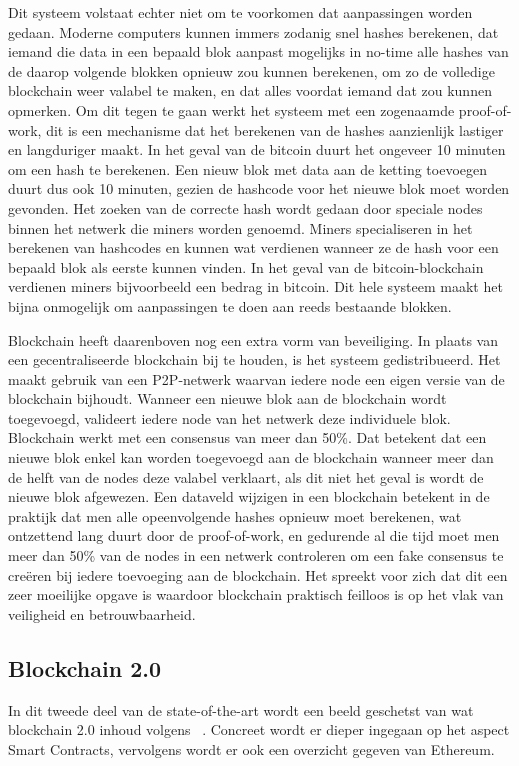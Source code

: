 Dit systeem volstaat echter niet om te voorkomen dat aanpassingen worden gedaan. Moderne computers kunnen immers zodanig snel hashes berekenen, dat iemand die data in een bepaald blok aanpast mogelijks in no-time alle hashes van de daarop volgende blokken opnieuw zou kunnen berekenen, om zo de volledige blockchain weer valabel te maken, en dat alles voordat iemand dat zou kunnen opmerken. Om dit tegen te gaan werkt het systeem met een zogenaamde proof-of-work, dit is een mechanisme dat het berekenen van de hashes aanzienlijk lastiger en  langduriger maakt. In het geval van de bitcoin duurt het ongeveer 10 minuten om een hash te berekenen. Een nieuw blok met data aan de ketting toevoegen duurt dus ook 10 minuten, gezien  de hashcode voor het  nieuwe blok moet worden gevonden. Het zoeken van de correcte hash wordt gedaan door speciale nodes binnen het netwerk die miners worden genoemd. Miners specialiseren in het berekenen van hashcodes en kunnen wat verdienen wanneer ze de hash voor een bepaald blok als eerste kunnen vinden. In het geval van de bitcoin-blockchain verdienen miners bijvoorbeeld een bedrag in bitcoin. Dit hele systeem maakt het bijna onmogelijk om aanpassingen te doen aan reeds bestaande blokken. 

Blockchain heeft daarenboven nog een extra vorm van beveiliging. In plaats van een gecentraliseerde blockchain bij te houden, is het systeem gedistribueerd. Het maakt gebruik van een P2P-netwerk waarvan iedere node een eigen versie van de blockchain bijhoudt. Wanneer een nieuwe blok aan de blockchain wordt toegevoegd, valideert iedere node van het netwerk deze individuele blok. Blockchain werkt met een consensus van meer dan 50\%. Dat betekent dat een nieuwe blok enkel kan worden toegevoegd aan de blockchain wanneer meer dan de helft van de nodes deze valabel verklaart, als dit niet het geval is wordt de nieuwe blok afgewezen. Een dataveld wijzigen in een blockchain betekent in de praktijk dat men alle opeenvolgende hashes opnieuw moet berekenen, wat ontzettend lang duurt door de proof-of-work, en  gedurende  al die tijd moet men meer dan 50\% van de nodes in een netwerk controleren om een fake consensus te creëren bij iedere toevoeging aan de blockchain. Het spreekt voor zich dat dit een zeer moeilijke opgave is waardoor blockchain praktisch feilloos is op het vlak van veiligheid en betrouwbaarheid.

\subsection*{Blockchain 2.0}
In dit tweede deel van de state-of-the-art wordt een beeld geschetst van wat blockchain 2.0 inhoud volgens ~\textcite{Swan2015}. Concreet wordt er dieper ingegaan op het aspect Smart Contracts, vervolgens wordt er ook een overzicht gegeven van Ethereum.

